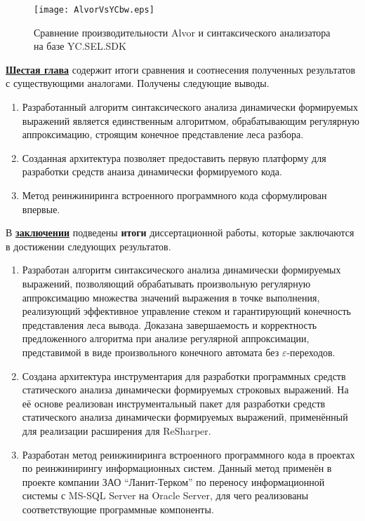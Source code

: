 \begin{figure}[]
 \centering
 \texttt{[image: AlvorVsYCbw.eps]}
 \caption{Сравнение производительности Alvor и синтаксического анализатора на базе YC.SEL.SDK}
 \label{fig:YCvsAlvor}
\end{figure}

\underline{\textbf{Шестая глава}} содержит итоги сравнения и соотнесения полученных результатов с существующими аналогами. Получены следующие выводы.
\begin{enumerate}
    \item Разработанный алгоритм синтаксического анализа динамически формируемых выражений является единственным алгоритмом, обрабатывающим регулярную аппроксимацию, строящим конечное представление леса разбора.
    \item Созданная архитектура позволяет предоставить первую платформу для разработки средств анаиза динамически формируемого кода.
    \item Метод реинжиниринга встроенного программного кода сформулирован впервые.
\end{enumerate}



В \underline{\textbf{заключении}} подведены \textbf{итоги} диссертационной работы, которые заключаются в достижении следующих результатов.

\begin{enumerate}
    \item Разработан алгоритм синтаксического анализа динамически формируемых выражений, позволяющий обрабатывать произвольную регулярную аппроксимацию множества значений выражения в точке выполнения, реализующий эффективное управление стеком и гарантирующий конечность представления леса вывода. Доказана завершаемость и корректность предложенного алгоритма при анализе регулярной аппроксимации, представимой в виде произвольного конечного автомата без $\varepsilon$-переходов.
    \item Создана архитектура инструментария для разработки программных средств статического анализа динамически формируемых строковых выражений. На её основе реализован инструментальный пакет для разработки средств статического анализа динамически формируемых выражений, применённый для реализации расширения для ReSharper.
    \item Разработан метод реинжиниринга встроенного программного кода в проектах по реинжинирингу информационных систем. Данный метод применён в проекте компании ЗАО ``Ланит-Терком'' по переносу информационной системы с MS-SQL Server на Oracle Server, для чего реализованы соответствующие программные компоненты.
\end{enumerate}

